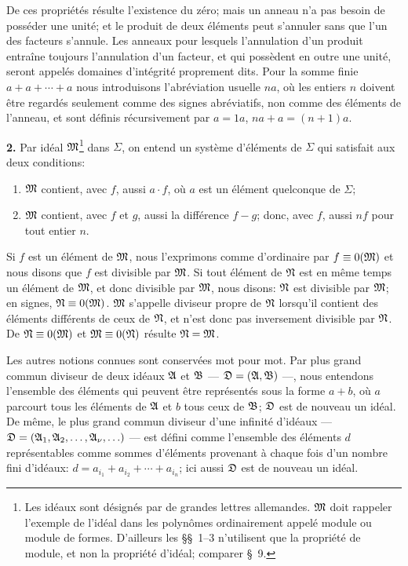 De ces propriétés résulte l'existence du zéro; mais un anneau n'a pas besoin de posséder une unité; et le produit de deux éléments peut s'annuler sans que l'un des facteurs s'annule. Les anneaux pour lesquels l'annulation d'un produit entraîne toujours l'annulation d'un facteur, et qui possèdent en outre une unité, seront appelés domaines d'intégrité proprement dits. Pour la somme finie $a+a+\cdots+a$ nous introduisons l'abréviation usuelle $na$, où les entiers $n$ doivent être regardés seulement comme des signes abréviatifs, non comme des éléments de l'anneau, et sont définis récursivement par $a=1a$, $na+a=(n+1)a$.

\textbf{2.} Par idéal $\mathfrak{M}$\footnote{Les idéaux sont désignés par de grandes lettres allemandes. $\mathfrak{M}$ doit rappeler l'exemple de l'idéal dans les polynômes ordinairement appelé \og{} module \fg{} ou module de formes. D'ailleurs les \S{}\S{}~1--3 n'utilisent que la propriété de module, et non la propriété d'idéal; comparer \S{}~9.} dans $\Sigma$, on entend un système d'éléments de $\Sigma$ qui satisfait aux deux conditions:
\begin{enumerate}
\item $\mathfrak{M}$ contient, avec $f$, aussi $a\cdot f$, où $a$ est un élément quelconque de $\Sigma$;
\item $\mathfrak{M}$ contient, avec $f$ et $g$, aussi la différence $f-g$; donc, avec $f$, aussi $nf$ pour tout entier $n$.
\end{enumerate}

Si $f$ est un élément de $\mathfrak{M}$, nous l'exprimons comme d'ordinaire par $f\equiv0(\mathfrak{M})$ et nous disons que $f$ est divisible par $\mathfrak{M}$. Si tout élément de $\mathfrak{N}$ est en même temps un élément de $\mathfrak{M}$, et donc divisible par $\mathfrak{M}$, nous disons: $\mathfrak{N}$ est divisible par $\mathfrak{M}$; en signes, $\mathfrak{N}\equiv0(\mathfrak{M})$. $\mathfrak{M}$ s'appelle diviseur propre de $\mathfrak{N}$ lorsqu'il contient des éléments différents de ceux de $\mathfrak{N}$, et n'est donc pas inversement divisible par $\mathfrak{N}$. De $\mathfrak{N}\equiv0(\mathfrak{M})$ et $\mathfrak{M}\equiv0(\mathfrak{N})$ résulte $\mathfrak{N}=\mathfrak{M}$.

Les autres notions connues sont conservées mot pour mot. Par plus grand commun diviseur de deux idéaux $\mathfrak{A}$ et $\mathfrak{B}$ --- $\mathfrak{D}=(\mathfrak{A},\mathfrak{B})$ ---, nous entendons l'ensemble des éléments qui peuvent être représentés sous la forme $a+b$, où $a$ parcourt tous les éléments de $\mathfrak{A}$ et $b$ tous ceux de $\mathfrak{B}$; $\mathfrak{D}$ est de nouveau un idéal. De même, le plus grand commun diviseur d'une infinité d'idéaux --- $\mathfrak{D}=(\mathfrak{A}_1,\mathfrak{A}_2,\ldots,\mathfrak{A}_\nu,\ldots)$ --- est défini comme l'ensemble des éléments $d$ représentables comme sommes d'éléments provenant à chaque fois d'un nombre fini d'idéaux:
$d=a_{i_1}+a_{i_2}+\cdots+a_{i_n}$; ici aussi $\mathfrak{D}$ est de nouveau un idéal.

